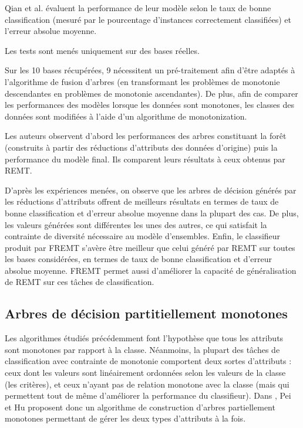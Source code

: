 \documentclass[a4paper]{article}
\begin{document}
Qian et al. évaluent la performance de leur modèle selon le taux de bonne
classification (mesuré par le pourcentage d'instances correctement classifiées)
et l'erreur absolue moyenne. 

Les tests sont menés uniquement sur des bases réelles.

\noindent Sur les 10 bases récupérées, 9 nécessitent un pré-traitement afin
d'être adaptés à l'algorithme de fusion d'arbres (en transformant les problèmes
de monotonie descendantes en problèmes de monotonie ascendantes). De plus, afin
de comparer les performances des modèles lorsque les données sont monotones, les
classes des données sont modifiées à l'aide d'un algorithme de monotonization.

\noindent Les auteurs observent d'abord les performances des arbres constituant
la forêt (construits à partir des réductions d'attributs des données d'origine)
puis la performance du modèle final. Ils comparent leurs résultats à ceux
obtenus par REMT.

\noindent D'après les expériences menées, on observe que les arbres de décision
générés par les réductions d'attributs offrent de meilleurs résultats en termes
de taux de bonne classification et d'erreur absolue moyenne dans la plupart des
cas. De plus, les valeurs générées sont différentes les unes des autres, ce qui
satisfait la contrainte de diversité nécessaire au modèle d'ensembles.
Enfin, le classifieur produit par FREMT s'avère être meilleur que
celui généré par REMT sur toutes les bases considérées, en termes de taux de
bonne classification et d'erreur absolue moyenne. FREMT permet aussi d'améliorer
la capacité de généralisation de REMT sur ces tâches de classification.


\subsection{Arbres de décision partitiellement monotones} 

Les algorithmes étudiés précédemment font l'hypothèse que tous les attributs
sont monotones par rapport à la classe. Néanmoins, la plupart des tâches de
classification avec contrainte de monotonie comportent deux sortes d'attributs :
ceux dont les valeurs sont linéairement ordonnées selon les valeurs de la classe
(les critères), et ceux n'ayant pas de relation monotone avec la classe (mais
qui permettent tout de même d'améliorer la performance du classifieur). Dans
\cite{pei-partially}, Pei et Hu proposent donc un algorithme de construction
d'arbres partiellement monotones permettant de gérer les deux types d'attributs
à la fois. 
\end{document}
